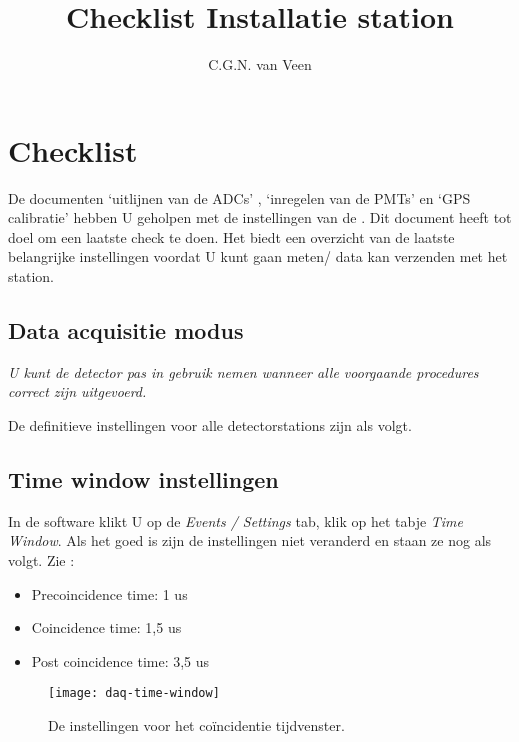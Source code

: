 

\title{Checklist Installatie station}
\author{C.G.N. van Veen}



\maketitle

\section{Checklist}

De documenten `uitlijnen van de ADCs' , `inregelen van de PMTs' en 
`GPS calibratie' hebben U geholpen met de instellingen van de \hisparc
\daq. Dit document heeft tot doel om een laatste check te doen. Het
biedt een overzicht van de laatste belangrijke instellingen voordat U kunt gaan
meten/ data kan verzenden met het \hisparc station. 

\subsection{Data acquisitie modus}

\emph{U kunt de detector pas in gebruik nemen wanneer alle voorgaande procedures correct zijn uitgevoerd.}

De definitieve instellingen voor alle \hisparc detectorstations zijn als volgt.

\subsection{Time window instellingen}

In de \daq software klikt U op de \emph{Events / Settings} tab, klik op het 
tabje \emph{Time Window}. Als het goed is zijn de instellingen niet veranderd 
en staan ze nog als volgt. Zie :

\begin{itemize}
    \item Precoincidence time: 1 us
    \item Coincidence time: 1,5 us
    \item Post coincidence time: 3,5 us
\end{itemize}

\begin{figure}
    \centering
    \texttt{[image: daq-time-window]}
    \caption{De instellingen voor het coïncidentie tijdvenster.}
    \label{fig:daq-time-window}
\end{figure}


